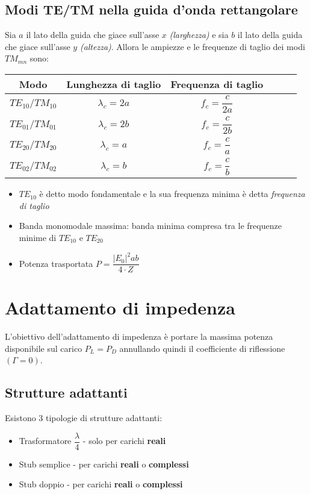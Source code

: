 \documentclass{article}
\begin{document}
\subsection{Modi TE/TM nella guida d'onda rettangolare}
Sia \(a\) il lato della guida che giace sull'asse \(x\) \textit{(larghezza)} e sia \(b\) il lato della guida che giace sull'asse \(y\) \textit{(altezza)}. Allora le ampiezze e le frequenze di taglio dei modi \(TM_{mn} \) sono:
\vspace{15pt}
\begin{center}
	\begin{tabular}{|Sc|Sc|Sc|}
		\hline 
		Modo & Lunghezza di taglio & Frequenza di taglio \\ 
		\hline 	
		\(TE_{10} / TM_{10}\) & \(\lambda_c = 2a\) & \(f_c = \dfrac{c}{2a}\) \\ 
		\hline 
		\(TE_{01} / TM_{01}\) & \(\lambda_c = 2b\) & \(f_c = \dfrac{c}{2b}\) \\ 
		\hline 
		\(TE_{20} / TM_{20}\) & \(\lambda_c = a\) & \(f_c = \dfrac{c}{a}\) \\ 
		\hline 
		\(TE_{02} / TM_{02}\) & \(\lambda_c = b\) & \(f_c = \dfrac{c}{b}\) \\ 
		\hline 
	\end{tabular} 
\end{center}
\vspace{5pt}
\begin{itemize}
	\item \(TE_{10}\) è detto modo fondamentale e la sua frequenza minima è detta \textit{frequenza di taglio}
	\item Banda monomodale massima: banda minima compresa tra le frequenze minime di \(TE_{10}\) e \(TE_{20}\)
	\item Potenza trasportata \( P = \dfrac{|E_0|^2 a b}{4 \cdot Z} \)
\end{itemize}

\newpage

\section{Adattamento di impedenza}
L'obiettivo dell'adattamento di impedenza è portare la massima potenza disponibile sul carico \(P_L = P_D\) annullando quindi il coefficiente di riflessione \( (\Gamma = 0) \).

\subsection{Strutture adattanti}
Esistono 3 tipologie di strutture adattanti:\
\begin{itemize}
	\item Trasformatore \( \dfrac{\lambda}{4} \) - solo per carichi \textbf{reali}
	\item Stub semplice - per carichi \textbf{reali} o \textbf{complessi}
	\item Stub doppio - per carichi \textbf{reali} o \textbf{complessi}
\end{itemize}
\end{document}
